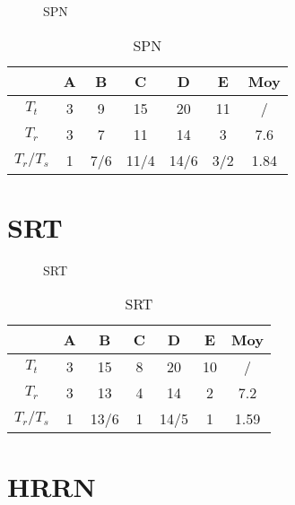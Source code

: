 \documentclass[a4, 11pt]{article}
\begin{document}
      \begin{figure}[h!]
         \centering
         
         \caption{SPN}
         \label{fig:spn}
      \end{figure}

      \begin{table}[ht!]
         \centering
         \begin{tabular}{c|c|c|c|c|c|c}
            & \textbf{A} & \textbf{B} & \textbf{C} & \textbf{D} & \textbf{E} & \textbf{Moy} \\ \hline
            $T_t$   & 3 & 9 & 15 & 20 & 11 & / \\ \hline
            $T_r$   & 3 & 7 & 11 & 14 & 3 & 7.6 \\ \hline
            $T_r / T_s$ & 1 & 7/6 & 11/4 & 14/6 & 3/2 & 1.84 \\
         \end{tabular}
         \caption{SPN}
         \label{tab:spn}
      \end{table}

   \section*{SRT}

      \begin{figure}[h!]
         \centering
         
         \caption{SRT}
         \label{fig:srt}
      \end{figure}

      \begin{table}[ht!]
         \centering
         \begin{tabular}{c|c|c|c|c|c|c}
            & \textbf{A} & \textbf{B} & \textbf{C} & \textbf{D} & \textbf{E} & \textbf{Moy} \\ \hline
            $T_t$   & 3 & 15  &   8  &  20  &  10 & / \\ \hline
            $T_r$   & 3  &13  &   4   & 14   & 2  &   7.2 \\ \hline
            $T_r / T_s$ & 1  &13/6  & 1  &  14/5 & 1  &   1.59 \\
         \end{tabular}
         \caption{SRT}
         \label{tab:srt}
      \end{table}

\newpage

   \section*{HRRN}
\end{document}
